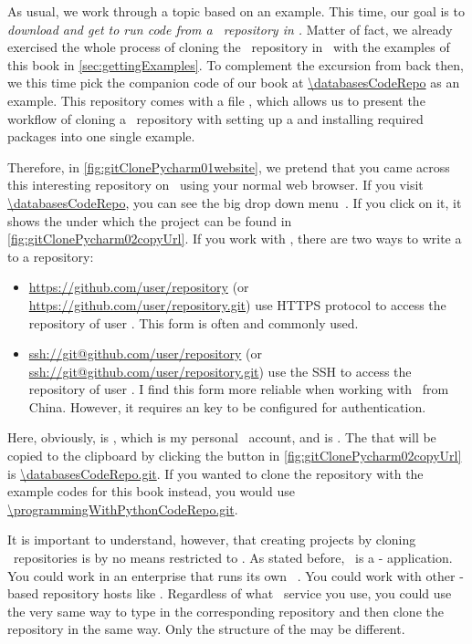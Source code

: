 As usual, we work through a topic based on an example.
This time, our goal is to \emph{download and get to run code from a \github\ repository in \pycharm.}
Matter of fact, we already exercised the whole process of cloning the \github\ repository in \pycharm\ with the examples of this book in \cref{sec:gettingExamples}.
To complement the excursion from back then, we this time pick the companion code of our  book at \url{\databasesCodeRepo} as an example.
This repository comes with a file , which allows us to present the workflow of cloning a \git\ repository with setting up a  and installing required packages into one single example.

Therefore, in \cref{fig:gitClonePycharm01website}, we pretend that you came across this interesting repository on \github\ using your normal web browser.
If you visit \url{\databasesCodeRepo}, you can see the big drop down menu~.
If you click on it, it shows the   under which the project can be found in \cref{fig:gitClonePycharm02copyUrl}.
If you work with \github, there are two ways to write a  to a repository:%
%
\begin{itemize}%
%
\item \url{https://github.com/user/repository} (or \url{https://github.com/user/repository.git}) use \gls{HTTPS} protocol to access the repository  of user . %
This form is often and commonly used.%
%
\item \url{ssh://git@github.com/user/repository} (or \url{ssh://git@github.com/user/repository.git}) use the \gls{SSH} to access the repository  of user . %
I find this form more reliable when working with \github\ from China. %
However, it requires an  key to be configured for authentication.%
%
\end{itemize}%
%
Here, obviously,  is , which is my personal \github\ account, and  is .
The  that will be copied to the clipboard by clicking the button in \cref{fig:gitClonePycharm02copyUrl} is \url{\databasesCodeRepo.git}.
If you wanted to clone the repository with the example codes for this book instead, you would use \url{\programmingWithPythonCodeRepo.git}.

It is important to understand, however, that creating projects by cloning \git\ repositories is by no means restricted to \github.
As stated before, \git\ is a - application.
You could work in an enterprise that runs its own \git\ .
You could work with other \git-based repository hosts like .
Regardless of what \git\ service you use, you could use the very same way to type in the corresponding repository  and then clone the repository in the same way.
Only the structure of the  may be different.

